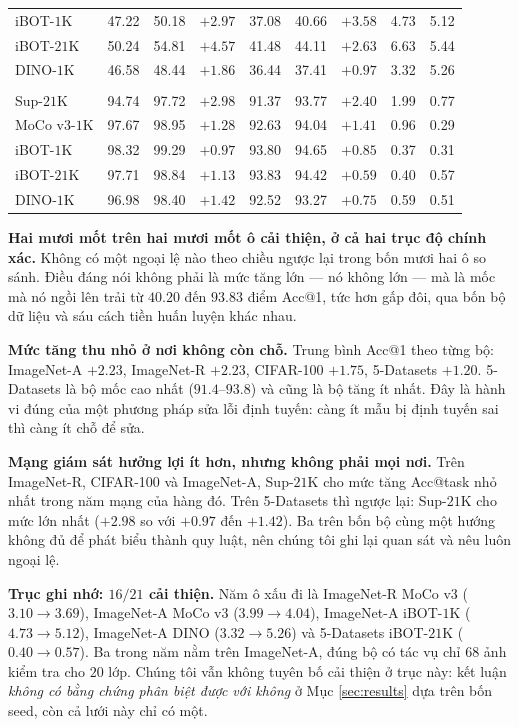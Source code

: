 \documentclass[11pt,a4paper]{article}
\begin{document}
\begin{table}[htbp]
\begin{tabular}{@{}lrrrrrrrr@{}}
iBOT-$1$K     & 47.22 & 50.18 & $+2.97$ & 37.08 & 40.66 & $+3.58$ & 4.73 & 5.12 \\
iBOT-$21$K    & 50.24 & 54.81 & $+4.57$ & 41.48 & 44.11 & $+2.63$ & 6.63 & 5.44 \\
DINO-$1$K     & 46.58 & 48.44 & $+1.86$ & 36.44 & 37.41 & $+0.97$ & 3.32 & 5.26 \\
\addlinespace
\multicolumn{9}{@{}l}{\emph{5-Datasets}}\\
Sup-$21$K     & 94.74 & 97.72 & $+2.98$ & 91.37 & 93.77 & $+2.40$ & 1.99 & 0.77 \\
MoCo v3-$1$K  & 97.67 & 98.95 & $+1.28$ & 92.63 & 94.04 & $+1.41$ & 0.96 & 0.29 \\
iBOT-$1$K     & 98.32 & 99.29 & $+0.97$ & 93.80 & 94.65 & $+0.85$ & 0.37 & 0.31 \\
iBOT-$21$K    & 97.71 & 98.84 & $+1.13$ & 93.83 & 94.42 & $+0.59$ & 0.40 & 0.57 \\
DINO-$1$K     & 96.98 & 98.40 & $+1.42$ & 92.52 & 93.27 & $+0.75$ & 0.59 & 0.51 \\
\bottomrule
\end{tabular}
\end{table}

\textbf{Hai mươi mốt trên hai mươi mốt ô cải thiện, ở cả hai trục độ chính
xác.} Không có một ngoại lệ nào theo chiều ngược lại trong bốn mươi hai ô so
sánh. Điều đáng nói không phải là mức tăng lớn --- nó không lớn --- mà là mốc
mà nó ngồi lên trải từ $40.20$ đến $93.83$ điểm Acc@1, tức hơn gấp đôi, qua
bốn bộ dữ liệu và sáu cách tiền huấn luyện khác nhau.

\textbf{Mức tăng thu nhỏ ở nơi không còn chỗ.} Trung bình Acc@1 theo từng bộ:
ImageNet-A $+2.23$, ImageNet-R $+2.23$, CIFAR-100 $+1.75$, 5-Datasets $+1.20$.
5-Datasets là bộ mốc cao nhất ($91.4$--$93.8$) và cũng là bộ tăng ít nhất. Đây
là hành vi đúng của một phương pháp sửa lỗi định tuyến: càng ít mẫu bị định
tuyến sai thì càng ít chỗ để sửa.

\textbf{Mạng giám sát hưởng lợi ít hơn, nhưng không phải mọi nơi.} Trên
ImageNet-R, CIFAR-100 và ImageNet-A, Sup-$21$K cho mức tăng Acc@task nhỏ nhất
trong năm mạng của hàng đó. Trên 5-Datasets thì ngược lại: Sup-$21$K cho mức
lớn nhất ($+2.98$ so với $+0.97$ đến $+1.42$). Ba trên bốn bộ cùng một hướng
không đủ để phát biểu thành quy luật, nên chúng tôi ghi lại quan sát và nêu
luôn ngoại lệ.

\textbf{Trục ghi nhớ: $16/21$ cải thiện.} Năm ô xấu đi là ImageNet-R MoCo v3
($3.10 \to 3.69$), ImageNet-A MoCo v3 ($3.99 \to 4.04$), ImageNet-A iBOT-$1$K
($4.73 \to 5.12$), ImageNet-A DINO ($3.32 \to 5.26$) và 5-Datasets iBOT-$21$K
($0.40 \to 0.57$). Ba trong năm nằm trên ImageNet-A, đúng bộ có tác vụ chỉ $68$
ảnh kiểm tra cho $20$ lớp. Chúng tôi vẫn không tuyên bố cải thiện ở trục này:
kết luận \emph{không có bằng chứng phân biệt được với không} ở Mục
\ref{sec:results} dựa trên bốn seed, còn cả lưới này chỉ có một.
\end{document}
